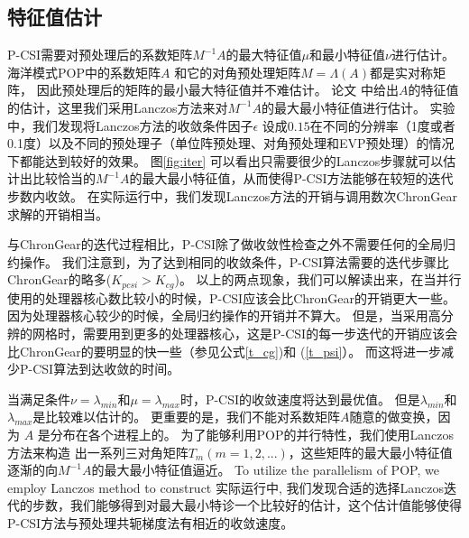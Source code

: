 \subsection{特征值估计}
\label{precond:pcsi:eigs}
P-CSI需要对预处理后的系数矩阵$M^{-1}A$的最大特征值$\mu$和最小特征值$\nu$进行估计。 
海洋模式POP中的系数矩阵$A$ 和它的对角预处理矩阵$M = \Lambda(A)$都是实对称矩阵， 因此预处理后的矩阵的最小最大特征值并不难估计。 
论文\cite{hu2013scalable} 中给出$A$的特征值的估计，这里我们采用Lanczos方法\cite{Paige1980235}来对$M^{-1}A$的最大最小特征值进行估计。
实验中，我们发现将Lanczos方法的收敛条件因子$\epsilon$ 设成$0.15$在不同的分辨率（1度或者0.1度）以及不同的预处理子（单位阵预处理、对角预处理和EVP预处理）的情况下都能达到较好的效果。 
图\ref{fig:iter} 可以看出只需要很少的Lanczos步骤就可以估计出比较恰当的$M^{-1}A$的最大最小特征值，从而使得P-CSI方法能够在较短的迭代步数内收敛。
在实际运行中，我们发现Lanczos方法的开销与调用数次ChronGear求解的开销相当。 

与ChronGear的迭代过程相比，P-CSI除了做收敛性检查之外不需要任何的全局归约操作。 
我们注意到，为了达到相同的收敛条件，P-CSI算法需要的迭代步骤比ChronGear的略多($K_{pcsi} > K_{cg}$)。 
以上的两点现象，我们可以解读出来，在当并行使用的处理器核心数比较小的时候，P-CSI应该会比ChronGear的开销更大一些。
因为处理器核心较少的时候，全局归约操作的开销并不算大。 
但是，当采用高分辨的网格时，需要用到更多的处理器核心，这是P-CSI的每一步迭代的开销应该会比ChronGear的要明显的快一些（参见公式\ref{t_cg})和
(\ref{t_psi}）。
而这将进一步减少P-CSI算法到达收敛的时间。 

当满足条件$\nu = \lambda_{min}$和$\mu =\lambda_{max}$时，P-CSI的收敛速度将达到最优值。 
但是$\lambda_{min}$和$\lambda_{max}$是比较难以估计的。
更重要的是，我们不能对系数矩阵$A$随意的做变换，因为 $A$ 是分布在各个进程上的。
为了能够利用POP的并行特性，我们使用Lanczos方法来构造 出一系列三对角矩阵$T_m (m=1,2,...)$，这些矩阵的最大最小特征值逐渐的向$M^{-1}A$的最大最小特征值逼近。
To utilize the parallelism of POP, we employ Lanczos method  to construct
实际运行中, 我们发现合适的选择Lanczos迭代的步数，我们能够得到对最大最小特诊一个比较好的估计，这个估计值能够使得P-CSI方法与预处理共轭梯度法有相近的收敛速度。  


